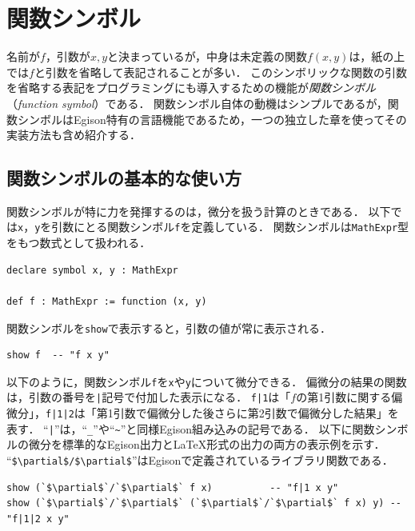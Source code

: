 \chapter{関数シンボル}\label{funcsym}

名前が$f$，引数が$x,y$と決まっているが，中身は未定義の関数$f(x,y)$は，紙の上では$f$と引数を省略して表記されることが多い．
このシンボリックな関数の引数を省略する表記をプログラミングにも導入するための機能が\emph{関数シンボル}（\emph{function symbol}）である．
関数シンボル自体の動機はシンプルであるが，関数シンボルはEgison特有の言語機能であるため，一つの独立した章を使ってその実装方法も含め紹介する．

\section{関数シンボルの基本的な使い方}\label{funcsym-intro}

関数シンボルが特に力を発揮するのは，微分を扱う計算のときである．
以下では\lstinline{x}，\lstinline{y}を引数にとる関数シンボル\lstinline{f}を定義している．
関数シンボルは\lstinline{MathExpr}型をもつ数式として扱われる．

\begin{lstlisting}[language=egison,numbers=none]
declare symbol x, y : MathExpr

def f : MathExpr := function (x, y)
\end{lstlisting}

関数シンボルを\lstinline{show}で表示すると，引数の値が常に表示される．

\begin{lstlisting}[language=egison,numbers=none]
show f  -- "f x y"
\end{lstlisting}

以下のように，関数シンボル\lstinline{f}を\lstinline{x}や\lstinline{y}について微分できる．
偏微分の結果の関数は，引数の番号を\verb!|!記号で付加した表示になる．
\verb!f|1!は「$f$の第1引数に関する偏微分」，\verb!f|1|2!は「第1引数で偏微分した後さらに第2引数で偏微分した結果」を表す．
``\verb!|!''は，``\verb!_!''や``\verb!~!''と同様Egison組み込みの記号である．
以下に関数シンボルの微分を標準的なEgison出力とLaTeX形式の出力の両方の表示例を示す．
``\lstinline[mathescape]{$\partial$/$\partial$}''はEgisonで定義されているライブラリ関数である．

\begin{lstlisting}[language=egison,numbers=none]
show (`$\partial$`/`$\partial$` f x)          -- "f|1 x y"
show (`$\partial$`/`$\partial$` (`$\partial$`/`$\partial$` f x) y) -- "f|1|2 x y"
\end{lstlisting}

